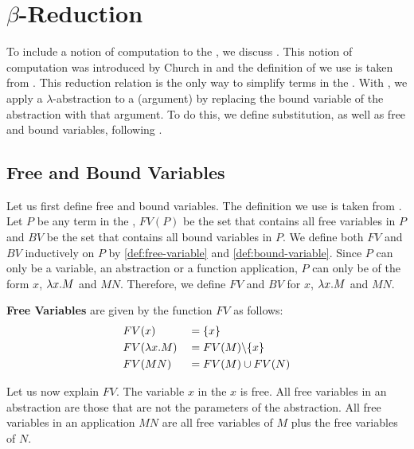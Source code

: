 \section{\texorpdfstring{\boldmath${\beta}$-Reduction}{Beta Reduction}}
To include a notion of computation to the \lc, we discuss \br.
This notion of computation was introduced by Church in \cite{original-lambda-calc} and
the definition of \br we use is taken from \cite{barendregt1992lambda}.
This reduction relation is the only way to simplify terms in the \lc.
With \br, we apply a $\lambda$-abstraction to a \lterm (argument) by replacing the bound variable of the abstraction with that argument.
To do this, we define substitution, as well as free and bound variables, following \cite{barendregt1992lambda}.

\subsection{Free and Bound Variables}
Let us first define free and bound variables. The definition we use is taken from \cite{PLOTKIN1975125, barendregt1992lambda}.
Let $P$ be any term in the \lc, $FV(P)$ be the set that contains all free variables in $P$ and $BV$ be the set that contains all bound variables in $P$.
We define both $FV$ and $BV$ inductively on $P$ by \cref{def:free-variable} and \cref{def:bound-variable}.
Since $P$ can only be a variable, an abstraction or a function application, $P$ can only be of the form $x$, $\lambda {x}.{M}$ and $M N$.
Therefore, we define $FV$ and $BV$ for $x$, $\lambda {x}.{M}$ and $M N$.

\begin{definition}
  \label{def:free-variable}
  \textbf{Free Variables} are given by the function $FV$ as follows:  \\
  \[
  \begin{aligned}
    & FV(x)           & &= \{x\} \\
    & FV(\lambda {x}.{M}) & &= FV(M) \backslash \{x\} \\
    & FV(M N)         & &= FV(M) \cup FV(N)
  \end{aligned}
  \]
\end{definition}

Let us now explain $FV$.
The variable $x$ in the \lterm $x$ is free. All free variables in an abstraction are those that are not the parameters of the abstraction.
All free variables in an application $M N$ are all free variables of $M$ plus the free variables of $N$.

